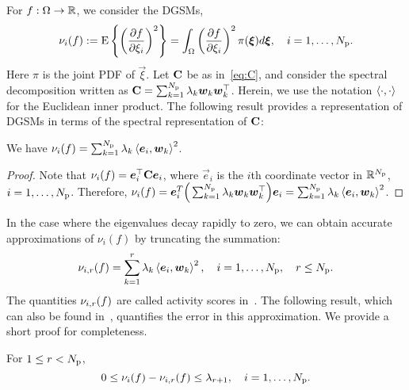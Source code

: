 For $f: \Omega \to \R$, we consider the DGSMs,
\[
    \nu_i(f) := \E{\left(\frac{\partial f}{\partial\xi_i}\right)^2} =
                  \int_\Omega 
                  \left(\frac{\partial f}{\partial\xi_i}\right)^2
                  \pi(\vec{\xi})d\vec{\xi}, \quad i = 1, \ldots, \Np.   
\]
Here $\pi$ is the joint PDF of $\vec\xi$. 
Let $\mat{C}$ be as in~\eqref{eq:C}, and consider the spectral decomposition written 
as $\mat{C} = \sum_{k=1}^\Np \lambda_k \vec{w}_k \vec{w}_k^\top$. Herein, we use the notation 
$\ip{\cdot}{\cdot}$ for the Euclidean inner product.
The following
result provides a representation of DGSMs in terms of the 
spectral representation of $\mat{C}$: 
\begin{lemma}
We have
$\nu_i(f) = \sum_{k=1}^\Np \lambda_k \ip{\vec{e}_i}{\vec{w}_k}^2$.
\end{lemma}
\begin{proof}
Note that $\nu_i(f) = \vec{e}_i^\top \mat{C} \vec{e}_i$,  
where $\vec{e}_i$ is the $i$th coordinate vector in $\R^\Np$, $i = 1, \ldots, \Np$.
Therefore,
$\nu_i(f) = \vec{e}_i^T \Big(\sum_{k=1}^\Np \lambda_k \vec{w}_k \vec{w}_k^\top\Big) \vec{e}_i
 = \sum_{k=1}^\Np \lambda_k \ip{\vec{e}_i}{\vec{w}_k}^2$. 
\end{proof}
In the case where the eigenvalues decay rapidly to zero, we can obtain
accurate approximations of $\nu_i(f)$ by truncating the summation: 
\[
   \act{f}{i}{r} =  \sum_{k=1}^r \lambda_k \ip{\vec{e}_i}{\vec{w}_k}^2,
   \quad i = 1, \ldots, \Np, \quad r \leq \Np.
\]
The quantities $\act{f}{i}{r}$ are called activity scores
in~\cite{Diaz:2016,Constantine:2017}.
The following result, which
can also be found in~\cite{Diaz:2016,Constantine:2017}, quantifies the error in this
approximation. We provide a short proof for completeness. 
\begin{proposition}\label{prp:dgsm_bound} 
For $1 \leq r < \Np$,
\[
0 \leq \nu_i(f) - \act{f}{i}{r} \leq \lambda_{r+1}, \quad i = 1, \ldots, \Np.
\] 
\end{proposition}

